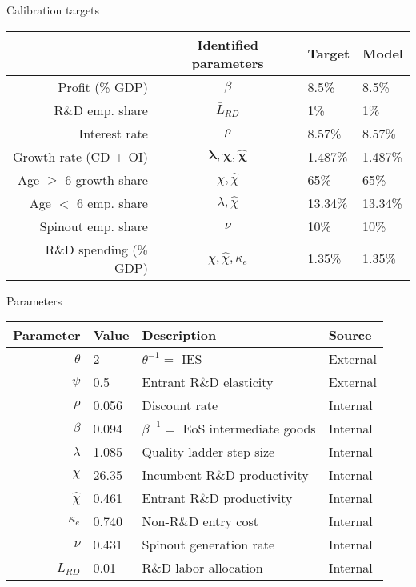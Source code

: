 \documentclass[english,usenames,dvipsnames]{beamer}
\begin{document}
\begin{frame}{Calibration targets}\label{calibration_targets}
\begin{table}[]
	\centering
	\label{calibration_targets}
	\small
	\begin{tabular}{rcll}
		\toprule \toprule
		& Identified parameters & Target & Model \tabularnewline
		\midrule
		Profit (\% GDP) & $\beta$ & 8.5\% & 8.5\% 
		\tabularnewline
		R\&D emp. share & $\bar{L}_{RD}$ & 1\% & 1\% 
		\tabularnewline
		Interest rate & $\rho$ & 8.57\% & 8.57\% 
		\tabularnewline
		Growth rate (CD + OI) & $\mathbf{\lambda, \chi, \hat{\chi}}$ & 1.487\% & 1.487\%
		\tabularnewline		
		Age $\ge$ 6 growth share & $\chi, \hat{\chi}$  & 65\% & 65\%
		\tabularnewline
		Age $<$ 6 emp. share  & $\lambda, \hat{\chi}$ & 13.34\% & 13.34\%
		\tabularnewline
		Spinout emp. share &$\nu$  & 10\% & 10\%
		\tabularnewline
		R\&D spending (\% GDP) & $\chi, \hat{\chi}, \kappa_e$  & 1.35\% & 1.35\%
		\tabularnewline
		\bottomrule
	\end{tabular}
\end{table}
\end{frame}


\begin{frame}{Parameters}\label{parameters}
\begin{table}[]
	\footnotesize
	\centering
	\label{calibration_parameters}
	\begin{tabular}{rlll}
		\toprule \toprule
		Parameter & Value & Description & Source \tabularnewline
		\midrule
		$\theta$ & 2 & $\theta^{-1} = $ IES & External
		\tabularnewline
		$\psi$ & 0.5 & Entrant R\&D elasticity & External \tabularnewline
		$\rho$ & 0.056 & Discount rate  & Internal \tabularnewline
		$\beta$ & 0.094 & $\beta^{-1} = $ EoS intermediate goods & Internal \tabularnewline 
		$\lambda$ & 1.085 & Quality ladder step size & Internal
		\tabularnewline
		$\chi$ & 26.35 & Incumbent R\&D productivity & Internal
		\tabularnewline
		$\hat{\chi}$ & 0.461 & Entrant R\&D productivity & Internal \tabularnewline 
		$\kappa_e$ & 0.740 & Non-R\&D entry cost & Internal \tabularnewline
		$\nu$ & 0.431 & Spinout generation rate  & Internal \tabularnewline
		$\bar{L}_{RD}$ & 0.01 & R\&D labor allocation  & Internal \tabularnewline
		\bottomrule
	\end{tabular}
\end{table}
\hyperlink{identification}{} 
\end{frame}
\end{document}
